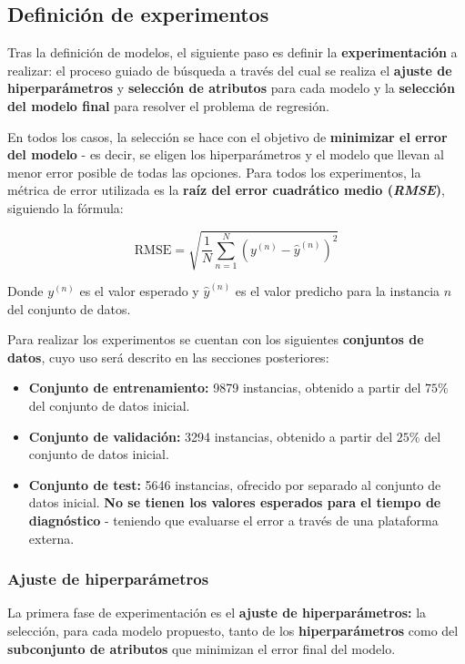 \subsection{Definición de experimentos}

Tras la definición de modelos, el siguiente paso es definir la \textbf{experimentación} a realizar: el proceso guiado de búsqueda a través del cual se realiza el \textbf{ajuste de hiperparámetros} y \textbf{selección de atributos} para cada modelo y la \textbf{selección del modelo final} para resolver el problema de regresión.

En todos los casos, la selección se hace con el objetivo de \textbf{minimizar el error del modelo} - es decir, se eligen los hiperparámetros y el modelo que llevan al menor error posible de todas las opciones. Para todos los experimentos, la métrica de error utilizada es la \textbf{raíz del error cuadrático medio (\textit{RMSE})}, siguiendo la fórmula:

$$\text{RMSE} = \sqrt{\frac{1}{N} \sum_{n=1}^{N}\left( y^{(n)} - \hat{y}^{(n)}\right)^2}$$

Donde $y^{(n)}$ es el valor esperado y $\hat{y}^{(n)}$ es el valor predicho para la instancia $n$ del conjunto de datos.

Para realizar los experimentos se cuentan con los siguientes \textbf{conjuntos de datos}, cuyo uso será descrito en las secciones posteriores:
\begin{itemize}[parsep=1pt, itemsep=1pt, topsep=4pt]
	\item \textbf{Conjunto de entrenamiento:} 9879 instancias, obtenido a partir del $75\%$ del conjunto de datos inicial.
	\item \textbf{Conjunto de validación:} 3294 instancias, obtenido a partir del $25\%$ del conjunto de datos inicial.
	\item \textbf{Conjunto de test:} 5646 instancias, ofrecido por separado al conjunto de datos inicial. \textbf{No se tienen los valores esperados para el tiempo de diagnóstico} - teniendo que evaluarse el error a través de una plataforma externa.
\end{itemize}

\subsubsection{Ajuste de hiperparámetros}

La primera fase de experimentación es el \textbf{ajuste de hiperparámetros:} la selección, para cada modelo propuesto, tanto de los \textbf{hiperparámetros} como del \textbf{subconjunto de atributos} que minimizan el error final del modelo. 

